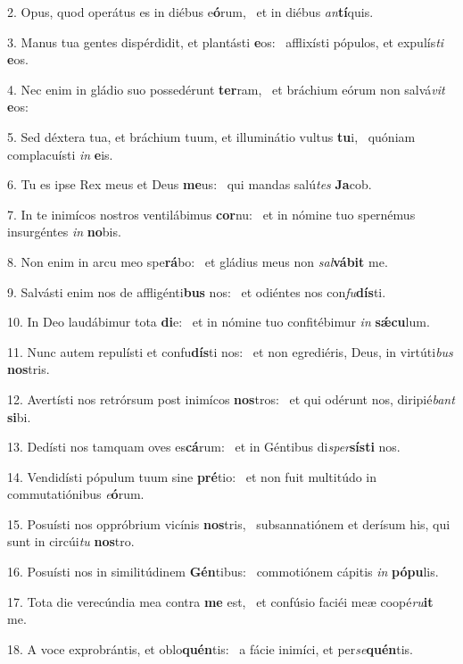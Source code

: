 2. Opus, quod operátus es in diébus e\textbf{ó}rum, \ast\  et in diébus \textit{an}\textbf{tí}quis.\

3. Manus tua gentes dispérdidit, et plantásti \textbf{e}os: \ast\  afflixísti pópulos, et expulís\textit{ti} \textbf{e}os.\

4. Nec enim in gládio suo possedérunt \textbf{ter}ram, \ast\  et bráchium eórum non salvá\textit{vit} \textbf{e}os:\

5. Sed déxtera tua, et bráchium tuum, et illuminátio vultus \textbf{tu}i, \ast\  quóniam complacuísti \textit{in} \textbf{e}is.\

6. Tu es ipse Rex meus et Deus \textbf{me}us: \ast\  qui mandas salú\textit{tes} \textbf{Ja}cob.\

7. In te inimícos nostros ventilábimus \textbf{cor}nu: \ast\  et in nómine tuo spernémus insurgéntes \textit{in} \textbf{no}bis.\

8. Non enim in arcu meo spe\textbf{rá}bo: \ast\  et gládius meus non \textit{sal}\textbf{vá}\textbf{bit} me.\

9. Salvásti enim nos de affligénti\textbf{bus} nos: \ast\  et odiéntes nos con\textit{fu}\textbf{dís}ti.\

10. In Deo laudábimur tota \textbf{di}e: \ast\  et in nómine tuo confitébimur \textit{in} \textbf{sǽ}\textbf{cu}lum.\

11. Nunc autem repulísti et confu\textbf{dís}ti nos: \ast\  et non egrediéris, Deus, in virtúti\textit{bus} \textbf{nos}tris.\

12. Avertísti nos retrórsum post inimícos \textbf{nos}tros: \ast\  et qui odérunt nos, diripié\textit{bant} \textbf{si}bi.\

13. Dedísti nos tamquam oves es\textbf{cá}rum: \ast\  et in Géntibus di\textit{sper}\textbf{sís}\textbf{ti} nos.\

14. Vendidísti pópulum tuum sine \textbf{pré}tio: \ast\  et non fuit multitúdo in commutatiónibus \textit{e}\textbf{ó}rum.\

15. Posuísti nos oppróbrium vicínis \textbf{nos}tris, \ast\  subsannatiónem et derísum his, qui sunt in circúi\textit{tu} \textbf{nos}tro.\

16. Posuísti nos in similitúdinem \textbf{Gén}tibus: \ast\  commotiónem cápitis \textit{in} \textbf{pó}\textbf{pu}lis.\

17. Tota die verecúndia mea contra \textbf{me} est, \ast\  et confúsio faciéi meæ coopé\textit{ru}\textbf{it} me.\

18. A voce exprobrántis, et oblo\textbf{quén}tis: \ast\  a fácie inimíci, et per\textit{se}\textbf{quén}tis.\

